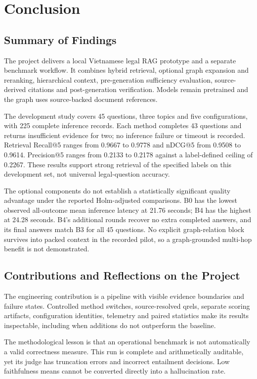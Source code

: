\chapter{Conclusion}\label{ch:conclusion}
\section{Summary of Findings}
The project delivers a local Vietnamese legal RAG prototype and a separate benchmark workflow. It combines hybrid retrieval, optional graph expansion and reranking, hierarchical context, pre-generation sufficiency evaluation, source-derived citations and post-generation verification. Models remain pretrained and the graph uses source-backed document references.

The development study covers 45 questions, three topics and five configurations, with 225 complete inference records. Each method completes 43 questions and returns insufficient evidence for two; no inference failure or timeout is recorded. Retrieval Recall@5 ranges from 0.9667 to 0.9778 and nDCG@5 from 0.9508 to 0.9614. Precision@5 ranges from 0.2133 to 0.2178 against a label-defined ceiling of 0.2267. These results support strong retrieval of the specified labels on this development set, not universal legal-question accuracy.

The optional components do not establish a statistically significant quality advantage under the reported Holm-adjusted comparisons. B0 has the lowest observed all-outcome mean inference latency at 21.76 seconds; B4 has the highest at 24.28 seconds. B4's additional rounds recover no extra completed answers, and its final answers match B3 for all 45 questions. No explicit graph-relation block survives into packed context in the recorded pilot, so a graph-grounded multi-hop benefit is not demonstrated.

\section{Contributions and Reflections on the Project}
The engineering contribution is a pipeline with visible evidence boundaries and failure states. Controlled method switches, source-resolved qrels, separate scoring artifacts, configuration identities, telemetry and paired statistics make its results inspectable, including when additions do not outperform the baseline.

The methodological lesson is that an operational benchmark is not automatically a valid correctness measure. This run is complete and arithmetically auditable, yet its judge has truncation errors and incorrect entailment decisions. Low faithfulness means cannot be converted directly into a hallucination rate.

